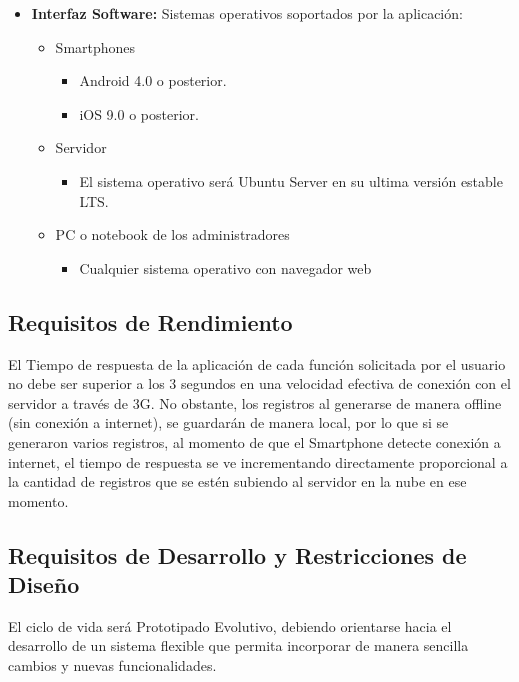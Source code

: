 \begin{itemize}
        \item \textbf{Interfaz Software:} 
          Sistemas operativos soportados por la aplicación:
          \begin{itemize}
            \item Smartphones 
            \begin{itemize}
              \item Android 4.0 o posterior.
              \item iOS 9.0 o posterior.
            \end{itemize}
            \item Servidor 
            \begin{itemize}
              \item  El sistema operativo será Ubuntu Server en su ultima versión estable LTS. 
            \end{itemize}
            \item PC o notebook de los administradores 
            \begin{itemize}
              \item Cualquier sistema operativo con navegador web 
            \end{itemize} 
          \end{itemize}
      \end{itemize}

    \subsection{Requisitos de Rendimiento}

      El Tiempo de respuesta de la aplicación de cada función solicitada por el usuario no debe ser superior a los 3 segundos en una velocidad efectiva de conexión con el servidor a través de 3G.
      No obstante, los registros al generarse de manera offline (sin conexión a internet), se guardarán de manera local, por lo que si se generaron varios registros, al momento de que el Smartphone detecte conexión a internet, el tiempo de respuesta se ve incrementando directamente proporcional a la cantidad de registros que se estén subiendo al servidor en la nube en ese momento.

    \subsection{Requisitos de Desarrollo y Restricciones de Diseño}

      El ciclo de vida será Prototipado Evolutivo, debiendo orientarse hacia el desarrollo de un sistema flexible que permita incorporar de manera sencilla cambios y nuevas funcionalidades.

